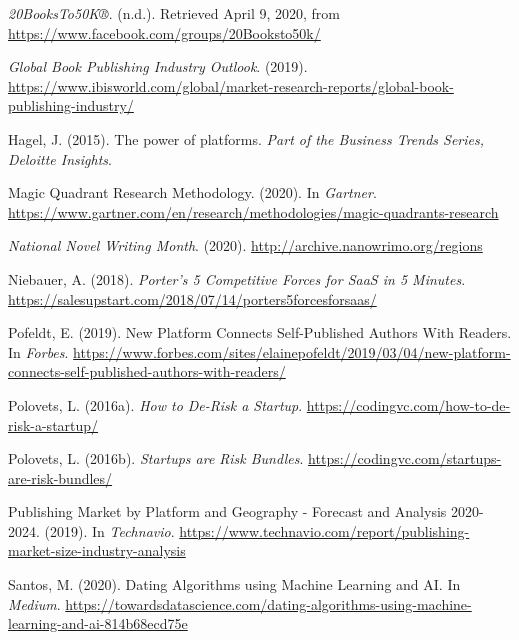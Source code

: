 \documentclass[11pt,openany]{book}
\newlength{\cslhangindent}
\newenvironment{cslreferences}%
  {\setlength{\parindent}{0pt}%
  \everypar{\setlength{\hangindent}{\cslhangindent}}\ignorespaces}%
  {\par}
\begin{document}
\hypertarget{refs}{}
\begin{cslreferences}
\leavevmode\hypertarget{ref-noauthor_20booksto50k_nodate}{}%
\emph{20BooksTo50K®}. (n.d.). Retrieved April 9, 2020, from
\url{https://www.facebook.com/groups/20Booksto50k/}

\leavevmode\hypertarget{ref-noauthor_ibisworld_nodate}{}%
\emph{Global Book Publishing Industry Outlook}. (2019).
\url{https://www.ibisworld.com/global/market-research-reports/global-book-publishing-industry/}

\leavevmode\hypertarget{ref-hagel_power_2015}{}%
Hagel, J. (2015). The power of platforms. \emph{Part of the Business
Trends Series, Deloitte Insights}.

\leavevmode\hypertarget{ref-gartner_magic_nodate}{}%
Magic Quadrant Research Methodology. (2020). In \emph{Gartner}.
\url{https://www.gartner.com/en/research/methodologies/magic-quadrants-research}

\leavevmode\hypertarget{ref-noauthor_national_nodate}{}%
\emph{National Novel Writing Month}. (2020).
\url{http://archive.nanowrimo.org/regions}

\leavevmode\hypertarget{ref-annelise_porters_nodate}{}%
Niebauer, A. (2018). \emph{Porter's 5 Competitive Forces for SaaS in 5
Minutes}.
\url{https://salesupstart.com/2018/07/14/porters5forcesforsaas/}

\leavevmode\hypertarget{ref-pofeldt_new_nodate}{}%
Pofeldt, E. (2019). New Platform Connects Self-Published Authors With
Readers. In \emph{Forbes}.
\url{https://www.forbes.com/sites/elainepofeldt/2019/03/04/new-platform-connects-self-published-authors-with-readers/}

\leavevmode\hypertarget{ref-polovets_how_nodate}{}%
Polovets, L. (2016a). \emph{How to De-Risk a Startup}.
\url{https://codingvc.com/how-to-de-risk-a-startup/}

\leavevmode\hypertarget{ref-polovets_startups_nodate}{}%
Polovets, L. (2016b). \emph{Startups are Risk Bundles}.
\url{https://codingvc.com/startups-are-risk-bundles/}

\leavevmode\hypertarget{ref-technavio_publishing_nodate}{}%
Publishing Market by Platform and Geography - Forecast and Analysis
2020-2024. (2019). In \emph{Technavio}.
\url{https://www.technavio.com/report/publishing-market-size-industry-analysis}

\leavevmode\hypertarget{ref-santos_dating_2020}{}%
Santos, M. (2020). Dating Algorithms using Machine Learning and AI. In
\emph{Medium}.
\url{https://towardsdatascience.com/dating-algorithms-using-machine-learning-and-ai-814b68ecd75e}


\end{cslreferences}
\end{document}
